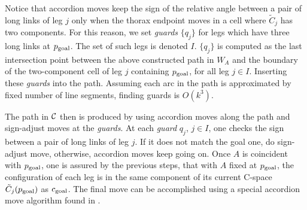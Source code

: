 \documentclass[twocolumn]{IEEEtran}
\begin{document}
\noindent {} Notice that accordion moves keep the 
sign of the relative angle between a pair of long links of leg $j$ 
only when the thorax endpoint moves in a cell where ${\tilde C}_j$ has two components. 
For this reason, we set {\em guards} $\{q_j\}$ for legs which have three long
links at $p_{\rm goal}$. The set of such legs is denoted $I$. 
$\{q_j\}$ is computed as the last intersection point between the above constructed path
in $W_A$ and the boundary of the two-component cell of leg $j$
containing $p_{\rm goal}$, for all leg $j \in I$. 
Inserting these {\em guards} into the
path. 
Assuming each arc in the path is approximated by fixed
number of line segments, finding guards is $O(k^3)$.

\noindent {} The
path in ${\cal C}$ then is produced by using accordion moves along
the path and sign-adjust moves at the {\em guards}. At each {\em
guard} $q_j$, $j\in I$, one checks the sign between a pair of long links of leg $j$. 
If it does not match the goal one, do sign-adjust
move, otherwise, accordion moves keep going on. Once $A$ is
coincident with $p_{\rm goal}$, one is assured by the previous
steps, that with $A$ fixed at $p_{\rm goal}$, the configuration of
each leg is in the same component of its current C-space $\tilde
C_j(p_{\rm goal})$ as $c_{\rm goal}$. The final move can be
accomplished using a special accordion move algorithm found in
\cite{TM02}. 
\end{document}
